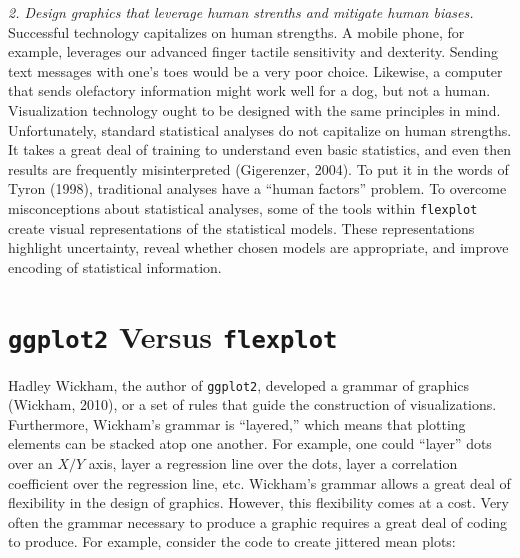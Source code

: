 \documentclass[
  english,
  man]{apa6}
\begin{document}
\emph{2. Design graphics that leverage human strenths and mitigate human biases.} Successful technology capitalizes on human strengths. A mobile phone, for example, leverages our advanced finger tactile sensitivity and dexterity. Sending text messages with one's toes would be a very poor choice. Likewise, a computer that sends olefactory information might work well for a dog, but not a human. Visualization technology ought to be designed with the same principles in mind. Unfortunately, standard statistical analyses do not capitalize on human strengths. It takes a great deal of training to understand even basic statistics, and even then results are frequently misinterpreted (Gigerenzer, 2004). To put it in the words of Tyron (1998), traditional analyses have a ``human factors'' problem. To overcome misconceptions about statistical analyses, some of the tools within \texttt{flexplot} create visual representations of the statistical models. These representations highlight uncertainty, reveal whether chosen models are appropriate, and improve encoding of statistical information.

\hypertarget{ggplot2-versus-flexplot}{%
\section{\texorpdfstring{\texttt{ggplot2} Versus \texttt{flexplot}}{ggplot2 Versus flexplot}}\label{ggplot2-versus-flexplot}}

Hadley Wickham, the author of \texttt{ggplot2}, developed a grammar of graphics (Wickham, 2010), or a set of rules that guide the construction of visualizations. Furthermore, Wickham's grammar is ``layered,'' which means that plotting elements can be stacked atop one another. For example, one could ``layer'' dots over an \(X/Y\) axis, layer a regression line over the dots, layer a correlation coefficient over the regression line, etc. Wickham's grammar allows a great deal of flexibility in the design of graphics. However, this flexibility comes at a cost. Very often the grammar necessary to produce a graphic requires a great deal of coding to produce. For example, consider the code to create jittered mean plots:

\small
\end{document}
